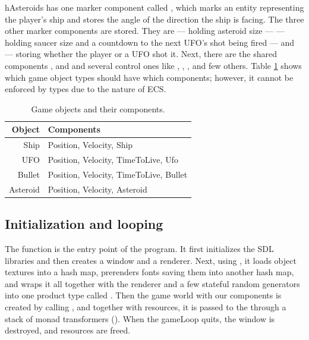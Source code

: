 \documentclass[
  digital, %
  color,   %
  table,   %
  oneside, %
  lof,     %
  lot,     %
]{fithesis3}
\begin{document}
hAsteroids has one  marker component called ,
which marks an entity representing the player's ship and stores
the angle of the direction the ship is facing. The three other marker
components are  stored. They are  — holding
asteroid size —  — holding saucer size and a countdown
to the next UFO's shot being fired — and  — storing whether
the player or a UFO shot it. Next, there are the shared components
,  and 
and several  control ones like ,
, ,  and few others.
Table \ref{tab:entities} shows which game object types should have which components;
however, it cannot be enforced by types due to the nature of ECS.

\begin{table}[hbt]
  \begin{tabularx}{\textwidth}{|r|X|}
    \toprule
    Object & Components \\
    \midrule
    Ship     & {Position}, {Velocity}, {Ship} \\
    UFO      & {Position}, {Velocity}, {TimeToLive}, {Ufo} \\
    Bullet   & {Position}, {Velocity}, {TimeToLive}, {Bullet} \\
    Asteroid & {Position}, {Velocity}, {Asteroid} \\
    \bottomrule
  \end{tabularx}
  \caption{Game objects and their components.}
  \label{tab:entities}
\end{table}


\subsection{Initialization and looping}
\label{sect:initialization}
The  function is the entry point of the program. It first initializes
the SDL libraries and then creates a window and a renderer. Next, using ,
it loads object textures into a hash map, prerenders fonts saving them into another
hash map, and wraps it all together with the renderer and a few stateful random generators
into one product type called . Then the game world with our
components is created by calling , and together with resources,
it is passed to the  through a stack
of monad transformers (). When the gameLoop quits,
the window is destroyed, and resources are freed.
\end{document}
